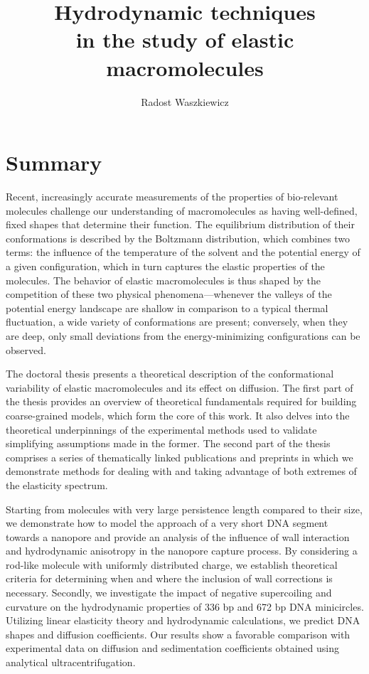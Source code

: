 \documentclass{doctoral}
\title{Hydrodynamic techniques\\in the study of elastic macromolecules}
\author{Radost Waszkiewicz}
\affiliation{University of Warsaw\\Faculty of Physics}
\begin{document}
\maketitle
{}

\section*{Summary}

Recent, increasingly accurate measurements of the properties of bio-relevant molecules challenge our understanding of macromolecules as having well-defined, fixed shapes that determine their function.
The equilibrium distribution of their conformations is described by the Boltzmann distribution, which combines two terms: the influence of the temperature of the solvent and the potential energy of a given configuration, which in turn captures the elastic properties of the molecules.
The behavior of elastic macromolecules is thus shaped by the competition of these two physical phenomena---whenever the valleys of the potential energy landscape are shallow in comparison to a typical thermal fluctuation, a wide variety of conformations are present; conversely, when they are deep, only small deviations from the energy-minimizing configurations can be observed.

The doctoral thesis presents a theoretical description of the conformational variability of elastic macromolecules and its effect on diffusion.
The first part of the thesis provides an overview of theoretical fundamentals required for building coarse-grained models, which form the core of this work.
It also delves into the theoretical underpinnings of the experimental methods used to validate simplifying assumptions made in the former.
The second part of the thesis comprises a series of thematically linked publications and preprints in which we demonstrate methods for dealing with and taking advantage of both extremes of the elasticity spectrum.

Starting from molecules with very large persistence length compared to their size, we demonstrate how to model the approach of a very short DNA segment towards a nanopore and provide an analysis of the influence of wall interaction and hydrodynamic anisotropy in the nanopore capture process.
By considering a rod-like molecule with uniformly distributed charge, we establish theoretical criteria for determining when and where the inclusion of wall corrections is necessary.
Secondly, we investigate the impact of negative supercoiling and curvature on the hydrodynamic properties of 336 bp and 672 bp DNA minicircles.
Utilizing linear elasticity theory and hydrodynamic calculations, we predict DNA shapes and diffusion coefficients.
Our results show a favorable comparison with experimental data on diffusion and sedimentation coefficients obtained using analytical ultracentrifugation.
\end{document}
